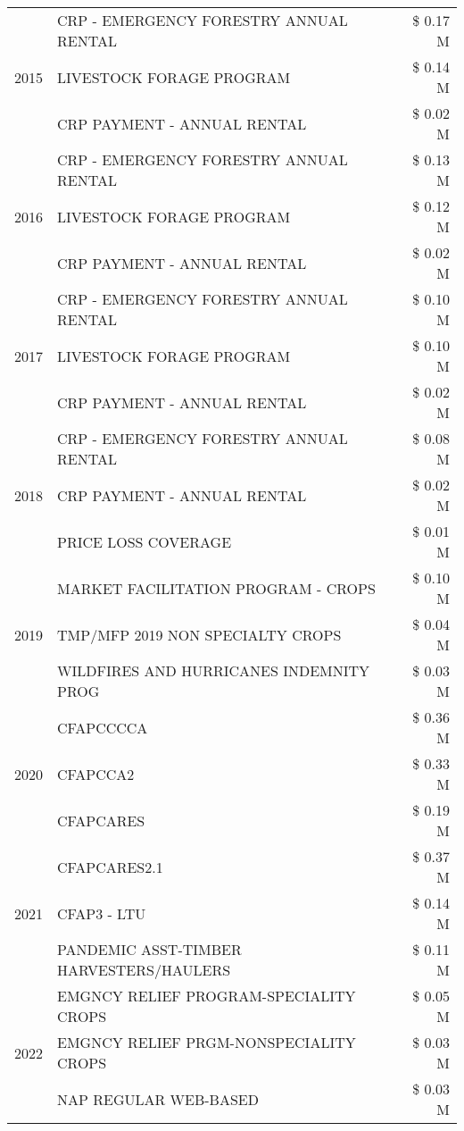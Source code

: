 \begin{tabular}{llr}
\multirow[t]{3}{*}{2015} & CRP - EMERGENCY FORESTRY ANNUAL RENTAL & \$ 0.17 M \\
 & LIVESTOCK FORAGE PROGRAM & \$ 0.14 M \\
 & CRP PAYMENT - ANNUAL RENTAL & \$ 0.02 M \\
\cline{1-3}
\multirow[t]{3}{*}{2016} & CRP - EMERGENCY FORESTRY ANNUAL RENTAL & \$ 0.13 M \\
 & LIVESTOCK FORAGE PROGRAM & \$ 0.12 M \\
 & CRP PAYMENT - ANNUAL RENTAL & \$ 0.02 M \\
\cline{1-3}
\multirow[t]{3}{*}{2017} & CRP - EMERGENCY FORESTRY ANNUAL RENTAL & \$ 0.10 M \\
 & LIVESTOCK FORAGE PROGRAM & \$ 0.10 M \\
 & CRP PAYMENT - ANNUAL RENTAL & \$ 0.02 M \\
\cline{1-3}
\multirow[t]{3}{*}{2018} & CRP - EMERGENCY FORESTRY ANNUAL RENTAL & \$ 0.08 M \\
 & CRP PAYMENT - ANNUAL RENTAL & \$ 0.02 M \\
 & PRICE LOSS COVERAGE & \$ 0.01 M \\
\cline{1-3}
\multirow[t]{3}{*}{2019} & MARKET FACILITATION PROGRAM - CROPS & \$ 0.10 M \\
 & TMP/MFP 2019 NON SPECIALTY CROPS & \$ 0.04 M \\
 & WILDFIRES AND HURRICANES INDEMNITY PROG & \$ 0.03 M \\
\cline{1-3}
\multirow[t]{3}{*}{2020} & CFAPCCCCA & \$ 0.36 M \\
 & CFAPCCA2 & \$ 0.33 M \\
 & CFAPCARES & \$ 0.19 M \\
\cline{1-3}
\multirow[t]{3}{*}{2021} & CFAPCARES2.1 & \$ 0.37 M \\
 & CFAP3 - LTU & \$ 0.14 M \\
 & PANDEMIC ASST-TIMBER HARVESTERS/HAULERS & \$ 0.11 M \\
\cline{1-3}
\multirow[t]{3}{*}{2022} & EMGNCY RELIEF PROGRAM-SPECIALITY CROPS & \$ 0.05 M \\
 & EMGNCY RELIEF PRGM-NONSPECIALITY CROPS & \$ 0.03 M \\
 & NAP REGULAR WEB-BASED & \$ 0.03 M \\
\cline{1-3}
\bottomrule
\end{tabular}
